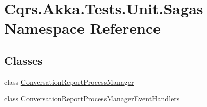 \hypertarget{namespaceCqrs_1_1Akka_1_1Tests_1_1Unit_1_1Sagas}{}\section{Cqrs.\+Akka.\+Tests.\+Unit.\+Sagas Namespace Reference}
\label{namespaceCqrs_1_1Akka_1_1Tests_1_1Unit_1_1Sagas}
\subsection*{Classes}
\begin{DoxyCompactItemize}
\item 
class \hyperlink{classCqrs_1_1Akka_1_1Tests_1_1Unit_1_1Sagas_1_1ConversationReportProcessManager}{Conversation\+Report\+Process\+Manager}
\item 
class \hyperlink{classCqrs_1_1Akka_1_1Tests_1_1Unit_1_1Sagas_1_1ConversationReportProcessManagerEventHandlers}{Conversation\+Report\+Process\+Manager\+Event\+Handlers}
\end{DoxyCompactItemize}
